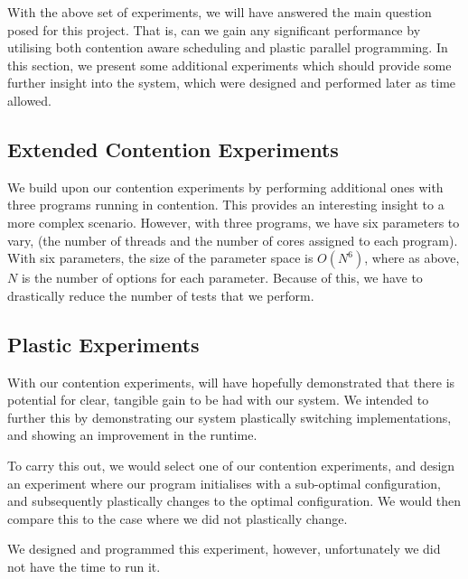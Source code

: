 With the above set of experiments, we will have answered the main question posed for this project. That is, can we gain any significant performance by utilising both contention aware scheduling and plastic parallel programming. In this section, we present some additional experiments which should provide some further insight into the system, which were designed and performed later as time allowed.



\subsection{Extended Contention Experiments}
\label{section:design:extended_contention_experiments}

We build upon our contention experiments by performing additional ones with three programs running in contention. This provides an interesting insight to a more complex scenario. However, with three programs, we have six parameters to vary, (the number of threads and the number of cores assigned to each program). With six parameters, the size of the parameter space is $O(N^6)$, where as above, $N$ is the number of options for each parameter. Because of this, we have to drastically reduce the number of tests that we perform.



\subsection{Plastic Experiments}
\label{section:design:plastic_experiment}

With our contention experiments, will have hopefully demonstrated that there is potential for clear, tangible gain to be had with our system. We intended to further this by demonstrating our system plastically switching implementations, and showing an improvement in the runtime. 

To carry this out, we would select one of our contention experiments, and design an experiment where our program initialises with a sub-optimal configuration, and subsequently plastically changes to the optimal configuration. We would then compare this to the case where we did not plastically change.

We designed and programmed this experiment, however, unfortunately we did not have the time to run it.